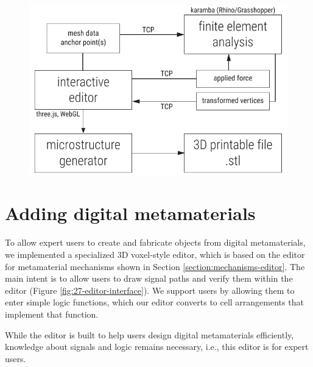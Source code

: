 \begin{figure} [h] 
    \includegraphics[width=\textwidth]{chapters/software-FIG/simple-software-architecture.pdf}
    \caption[Short figure name.]{
    \label{fig:simple-software-architecture}}
\end{figure}







\section{Adding digital metamaterials}
To allow expert users to create and fabricate objects from digital metamaterials, we implemented a specialized 3D voxel-style editor, which is based on the editor for metamaterial mechanisms shown in Section \ref{section:mechanisms-editor}. The main intent is to allow users to draw signal paths and verify them within the editor (Figure \ref{fig:27-editor-interface}). We support users by allowing them to enter simple logic functions, which our editor converts to cell arrangements that implement that function.

While the editor is built to help users design digital metamaterials efficiently, knowledge about signals and logic remains necessary, i.e., this editor is for expert users. 

